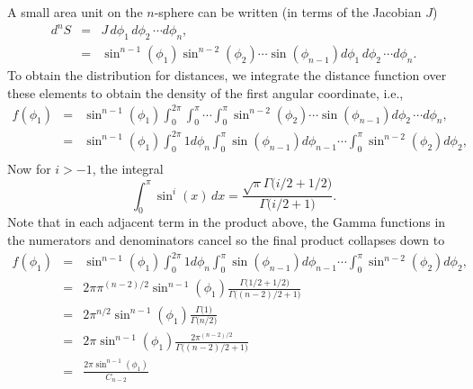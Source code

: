 A small area unit on the $n$-sphere can be written (in terms of the
Jacobian $J$)
\begin{eqnarray}
  \label{eq:vn_n_sphere}
  d^nS & = & J \, d\phi_1 \, d\phi_2 \, \cdots d\phi_{n},  \nonumber \\
       & = & \sin^{n-1}(\phi_1) \sin^{n-2}(\phi_2) \cdots \sin(\phi_{n-1})
                  d\phi_1 \, d\phi_2 \, \cdots d\phi_{n}.
\end{eqnarray}
To obtain the distribution for distances, we integrate the distance
function over these elements to obtain the density of the first
angular coordinate, i.e.,
\begin{eqnarray}
  f(\phi_1)
      & = & \sin^{n-1}(\phi_1)
              \int_{0}^{2\pi} \int_{0}^{\pi} \cdots  \int_{0}^{\pi} 
              \sin^{n-2}(\phi_2) \cdots \sin(\phi_{n-1})
                   d\phi_2 \, \cdots d\phi_{n}, \nonumber \\
      & = & \sin^{n-1}(\phi_1)
              \int_{0}^{2\pi} 1 d\phi_{n} 
              \int_{0}^{\pi} \sin(\phi_{n-1}) d\phi_{n-1}  
              \cdots  
              \int_{0}^{\pi} \sin^{n-2}(\phi_2)  d\phi_{2}, \nonumber \\   
\end{eqnarray}
Now for $i>-1$, the integral %
\begin{equation}
  \label{eq:int_sin_n}
  \int_0^{\pi} \sin^i(x) \, dx = 
       \frac{\sqrt{\pi} \Gamma\big( i/2 + 1/2 \big)}{\Gamma\big( i/2+1 \big)}.
\end{equation}
Note that in each adjacent term in the product above, the Gamma
functions in the numerators and denominators cancel so the final
product collapses down to
\begin{eqnarray}
  f(\phi_1)
      & = & \sin^{n-1}(\phi_1)
              \int_{0}^{2\pi} 1 d\phi_{n} 
              \int_{0}^{\pi} \sin(\phi_{n-1}) d\phi_{n-1}  
              \cdots  
              \int_{0}^{\pi} \sin^{n-2}(\phi_2)  d\phi_{2}, \nonumber \\   
      & = & 2 \pi \pi^{(n-2)/2} \sin^{n-1}(\phi_1)  
                     \frac{\Gamma\big( 1/2 + 1/2 \big)}{\Gamma\big( (n-2)/2+1 \big)}
                 \nonumber \\   
      & = & 2 \pi^{n/2} \sin^{n-1}(\phi_1)  
                     \frac{\Gamma\big(1 \big)}{\Gamma\big( n/2 \big)}
                 \nonumber \\   
      & = &  2 \pi \sin^{n-1}(\phi_1)  
                     \frac{2 \pi^{(n-2)/2}}{\Gamma\big( (n-2)/2+1 \big)}
                 \nonumber \\   
      & = &   \frac{2 \pi \sin^{n-1}(\phi_1)}{C_{n-2}}
                 \nonumber \\   
\end{eqnarray}



